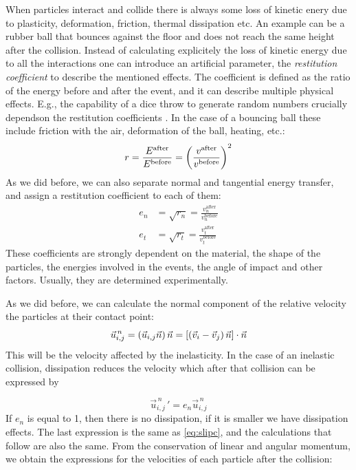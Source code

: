 When particles interact and collide there is always some loss of kinetic enery due to plasticity, deformation, friction, thermal dissipation etc. An example can be a rubber ball that bounces against the floor and does not reach the same height after the collision. Instead of calculating explicitely the loss of kinetic energy due to all the interactions one can introduce an artificial parameter, the \emph{restitution coefficient} to describe the mentioned effects. The coefficient is defined as the ratio of the energy before and after the event, and it can describe multiple physical effects. E.g., the capability of a dice throw to generate random numbers crucially dependson the restitution coefficients \citep{nagler_dice}. In the case of a bouncing ball these include friction with the air, deformation of the ball, heating, etc.:
\begin{equation}
r = \frac{E^{\text{after}}}{E^{\text{before}}} = \left(\frac{v^{\text{after}}}{v^{\text{before}}}\right)^2
\end{equation}
As we did before, we can also separate normal and tangential energy transfer, and assign a restitution coefficient to each of them:
\begin{align}
e_n &= \sqrt{r_n} = \frac{v_n^{\text{after}}}{v_n^{\text{before}}}\\
e_t &= \sqrt{r_t} = \frac{v_t^{\text{after}}}{v_t^{\text{before}}}
\end{align}
These coefficients are strongly dependent on the material, the shape of the particles, the energies involved in the events, the angle of impact and other factors. Usually, they are determined experimentally.








As we did before, we can calculate the normal component of the relative velocity the particles at their contact point:
\begin{equation}
\vec{u}_{i,j}^{\,n} =  \left(\vec{u}_{i,j}\vec{n}\right) \vec{n} = \left[\left(\vec{v}_{i}-\vec{v}_{j}\right)\vec{n}\right]\cdot\vec{n}
\end{equation}
This will be the velocity affected by the inelasticity. In the case of an inelastic collision, dissipation reduces the velocity which after that collision can be expressed by


\begin{equation}
\vec{u}_{i,j}^{\,n}\,' = e_n \vec{u}_{i,j}^{\,n}
\end{equation}
If $e_n$ is equal to 1, then there is no dissipation, if it is smaller we have dissipation effects. The last expression is the same as \eqref{eq:slipc}, and the calculations that follow are also the same. From the conservation of linear and angular momentum, we obtain the expressions for the velocities of each particle after the collision:

